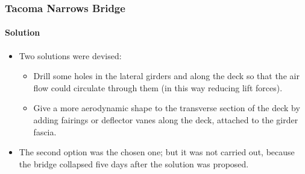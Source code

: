\begin{frame}[hasprev=true, hasnext=false]
\frametitle{Tacoma Narrows Bridge}
\framesubtitle{Solution}

\begin{itemize}
	\item Two solutions were devised:
	\begin{itemize}
		\item Drill some holes in the lateral girders and along the deck so
		that the air flow could circulate through them (in this way reducing
		lift forces).

		\item Give a more aerodynamic shape to the transverse section of the
		deck by adding fairings or deflector vanes along the deck, attached to
		the girder fascia.
	\end{itemize}

	\item The second option was the chosen one; but it was not carried out,
	because the bridge collapsed five days after the solution was proposed.
\end{itemize}
\end{frame}
